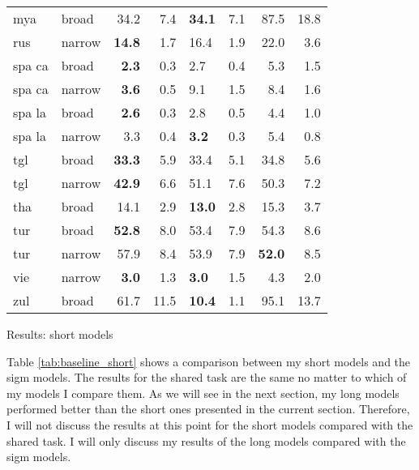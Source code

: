 {\begin{tabularx}{1.1\textwidth}{|l|X||r|r||X|X||r|r|}
mya    & broad  & 34.2 & 7.4  & \textbf{34.1} & 7.1  & 87.5 & 18.8 \\
rus    & narrow & \textbf{14.8} & 1.7  & 16.4 & 1.9  & 22.0 & 3.6  \\
spa ca & broad  & \textbf{2.3}  & 0.3  & 2.7  & 0.4  & 5.3  & 1.5  \\
spa ca & narrow & \textbf{3.6}  & 0.5  & 9.1  & 1.5  & 8.4  & 1.6  \\
spa la & broad  & \textbf{2.6}  & 0.3  & 2.8  & 0.5  & 4.4  & 1.0  \\
spa la & narrow & 3.3  & 0.4  & \textbf{3.2}  & 0.3  & 5.4  & 0.8  \\
tgl    & broad  & \textbf{33.3} & 5.9  & 33.4 & 5.1  & 34.8 & 5.6  \\
tgl    & narrow & \textbf{42.9} & 6.6  & 51.1 & 7.6  & 50.3 & 7.2  \\
tha    & broad  & 14.1 & 2.9  & \textbf{13.0} & 2.8  & 15.3 & 3.7  \\
tur    & broad  & \textbf{52.8} & 8.0  & 53.4 & 7.9  & 54.3 & 8.6  \\
tur    & narrow & 57.9 & 8.4  & 53.9 & 7.9  & \textbf{52.0} & 8.5  \\
vie    & narrow & \textbf{3.0}  & 1.3  & \textbf{3.0}  & 1.5  & 4.3  & 2.0  \\
zul    & broad  & 61.7 & 11.5 & \textbf{10.4} & 1.1  & 95.1 & 13.7 \\ \hline
\end{tabularx}
}{Results: short models}

Table \ref{tab:baseline_short} shows a comparison between my short models and the \ac{sigm} models. The results for the shared task are the same no matter to which of my models I compare them. As we will see in the next section, my long models performed better than the short ones presented in the current section. Therefore, I will not discuss the results at this point for the short models compared with the shared task. I will only discuss my results of the long models compared with the \ac{sigm} models.

